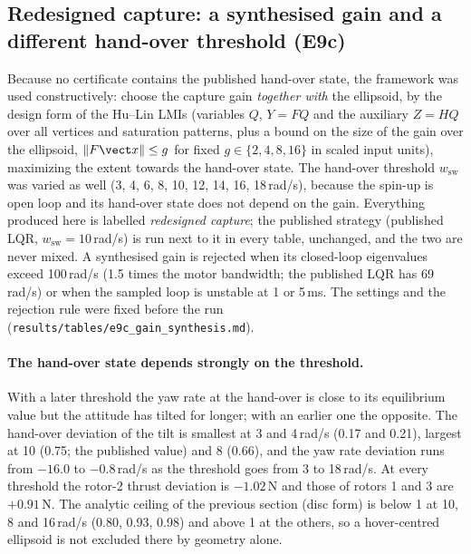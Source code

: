 \subsection{Redesigned capture: a synthesised gain and a different hand-over threshold (E9c)}\label{sec:redesign}
Because no certificate contains the published hand-over state, the framework was used constructively: choose the capture gain \emph{together with} the ellipsoid, by the design form of the Hu--Lin LMIs (variables $Q$, $Y=FQ$ and the auxiliary $Z=HQ$ over all vertices and saturation patterns, plus a bound on the size of the gain over the ellipsoid, $\|F\vect x\|\le g$ for fixed $g\in\{2,4,8,16\}$ in scaled input units), maximizing the extent towards the hand-over state. The hand-over threshold $w_{\mathrm{sw}}$ was varied as well (3, 4, 6, 8, 10, 12, 14, 16, 18\,rad/s), because the spin-up is open loop and its hand-over state does not depend on the gain. Everything produced here is labelled \emph{redesigned capture}; the published strategy (published LQR, $w_{\mathrm{sw}}=10$\,rad/s) is run next to it in every table, unchanged, and the two are never mixed. A synthesised gain is rejected when its closed-loop eigenvalues exceed 100\,rad/s (1.5 times the motor bandwidth; the published LQR has 69\,rad/s) or when the sampled loop is unstable at 1 or 5\,ms. The settings and the rejection rule were fixed before the run (\texttt{results/tables/e9c\_gain\_synthesis.md}).

\paragraph{The hand-over state depends strongly on the threshold.} With a later threshold the yaw rate at the hand-over is close to its equilibrium value but the attitude has tilted for longer; with an earlier one the opposite. The hand-over deviation of the tilt is smallest at 3 and 4\,rad/s (0.17 and 0.21), largest at 10 (0.75; the published value) and 8 (0.66), and the yaw rate deviation runs from $-16.0$ to $-0.8$\,rad/s as the threshold goes from 3 to 18\,rad/s. At every threshold the rotor-2 thrust deviation is $-1.02$\,N and those of rotors 1 and 3 are $+0.91$\,N. The analytic ceiling of the previous section (disc form) is below 1 at 10, 8 and 16\,rad/s (0.80, 0.93, 0.98) and above 1 at the others, so a hover-centred ellipsoid is not excluded there by geometry alone.

